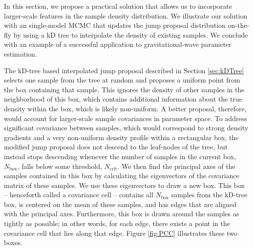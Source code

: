 \documentclass{rsos}
\newcommand{\Nbox}{N_\mathrm{box}}
\newcommand{\Ncrit}{N_\mathrm{crit}}
\begin{document}
In this section, we propose a practical solution that allows us to incorporate larger-scale features in the sample density distribution.  We illustrate our solution with an single-model MCMC that updates the jump proposal distribution on-the-fly by using a kD tree to interpolate the density of existing samples.  We conclude with an example of a successful application to gravitational-wave parameter estimation.

The kD-tree based interpolated jump proposal described in Section \ref{sec:kDTree} selects one sample from the tree at random and proposes a uniform point from the box containing that sample.  This ignores the density of other samples in the neighborhood of this box, which contains additional information about the true density within the box, which is likely non-uniform.  A better proposal, therefore, would account for larger-scale sample covariances in parameter space.  To address significant covariance between samples, which would correspond to strong density gradients and a very non-uniform density profile within a rectangular box, the modified jump proposal does not descend to the leaf-nodes of the tree, but instead stops descending whenever the number of samples in the current box, $\Nbox$, falls below some threshold, $\Ncrit$. We then find the principal axes of the samples
contained in this box by calculating the eigenvectors of the covariance matrix of these samples. We use these eigenvectors to draw a new box. This box -- henceforth called a covariance cell -- contains all $\Nbox$ samples from the kD-tree box, is centered on the mean of these samples, and has edges that are aligned with the principal axes. Furthermore, this box is drawn around the samples as tightly as possible; in other words, for each edge, there exists a point in the covariance cell that lies along that edge. Figure \ref{fig:PCC} illustrates these two boxes.
\end{document}
